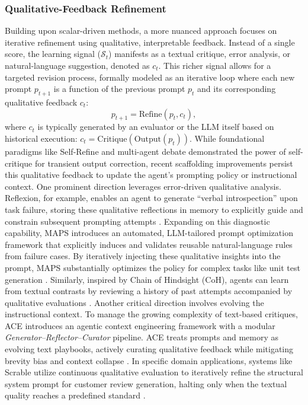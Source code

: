 \subsubsection{Qualitative-Feedback Refinement}
\label{sec:Qualitative_Feedback_Refinement}

Building upon scalar-driven methods, a more nuanced approach focuses on iterative refinement using qualitative, interpretable feedback. Instead of a single score, the learning signal ($\mathcal{S}_t$) manifests as a textual critique, error analysis, or natural-language suggestion, denoted as $c_t$. This richer signal allows for a targeted revision process, formally modeled as an iterative loop where each new prompt $p_{t+1}$ is a function of the previous prompt $p_t$ and its corresponding qualitative feedback $c_t$:
\begin{equation}p_{t+1} = \text{Refine}(p_t, c_t),
\end{equation}
where $c_t$ is typically generated by an evaluator or the LLM itself based on historical execution: $c_t = \text{Critique}(\text{Output}(p_t))$. While foundational paradigms like Self-Refine \citep{madaan2023self} and multi-agent debate \citep{liang2023debate} demonstrated the power of self-critique for transient output correction, recent scaffolding improvements persist this qualitative feedback to update the agent's prompting policy or instructional context. One prominent direction leverages error-driven qualitative analysis. Reflexion, for example, enables an agent to generate ``verbal introspection'' upon task failure, storing these qualitative reflections in memory to explicitly guide and constrain subsequent prompting attempts \citep{shinn2023reflexionlanguageagentsverbal}. Expanding on this diagnostic capability, MAPS introduces an automated, LLM-tailored prompt optimization framework that explicitly induces and validates reusable natural-language rules from failure cases. By iteratively injecting these qualitative insights into the prompt, MAPS substantially optimizes the policy for complex tasks like unit test generation \citep{gao2025promptalchemistautomatedllmtailored}. Similarly, inspired by Chain of Hindsight (CoH), agents can learn from textual contrasts by reviewing a history of past attempts accompanied by qualitative evaluations \citep{liu2023chain}. Another critical direction involves evolving the instructional context. To manage the growing complexity of text-based critiques, ACE introduces an agentic context engineering framework with a modular \textit{Generator–Reflector–Curator} pipeline. ACE treats prompts and memory as evolving text playbooks, actively curating qualitative feedback while mitigating brevity bias and context collapse \citep{zhang2025agenticcontextengineeringevolving}. In specific domain applications, systems like Scrable utilize continuous qualitative evaluation to iteratively refine the structural system prompt for customer review generation, halting only when the textual quality reaches a predefined standard \citep{azov2024selfimprovingcustomerreviewresponse}.


